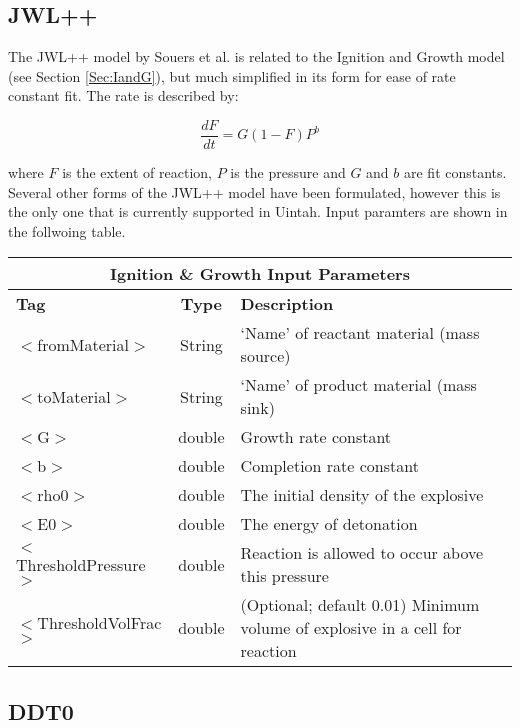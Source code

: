 \newpage
\subsection{JWL++} \label {Sec:JWLpp}

The JWL++ model by Souers et al. \cite{ref:JWL} is related to the Ignition and Growth model (see Section \ref{Sec:IandG}),
but much simplified in its form for ease of rate constant fit.  The rate is described by:

\begin{equation}
\frac{dF}{dt}=G(1-F)P^b
\label{JWLppEqn}
\end{equation}

where $F$ is the extent of reaction, $P$ is the pressure and $G$ and $b$ are fit constants.  Several other
forms of the JWL++ model have been formulated, however this is the only one that is currently supported in 
Uintah.  Input paramters are shown in the follwoing table.

\begin{center}
\begin{tabular}{| l | c | p{7cm} |}
\hline
  \multicolumn{3}{|c|}{\textbf{Ignition \& Growth Input Parameters}} \\
\hline
\hline
  \textbf{Tag} & \textbf{Type} & \textbf{Description}\\
\hline
  $<$fromMaterial$>$ & String & `Name' of reactant material (mass source)\\
\hline
  $<$toMaterial$>$ & String & `Name' of product material (mass sink)\\
\hline
  $<$G$>$ & double & Growth rate constant \\
\hline
  $<$b$>$ & double & Completion rate constant \\
\hline
  $<$rho0$>$ & double & The initial density of the explosive \\
\hline
  $<$E0$>$ & double & The energy of detonation \\
\hline
  $<$ThresholdPressure$>$ & double & Reaction is allowed to occur above this pressure \\
\hline
  $<$ThresholdVolFrac$>$ & double & (Optional; default 0.01) Minimum volume of explosive in a cell for reaction \\
\hline
\end{tabular}
\end{center}




\newpage
\subsection{DDT0} \label {Sec:DDT0}

